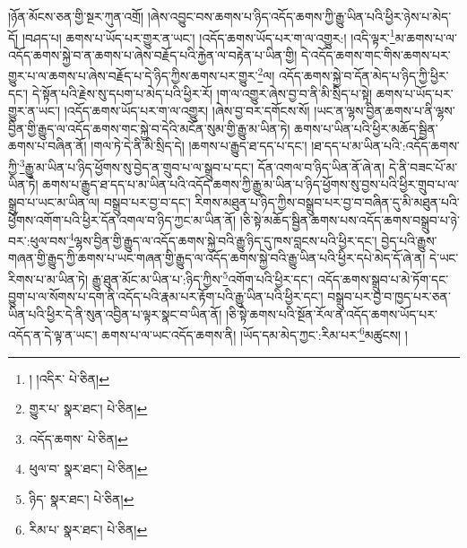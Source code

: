 །ཉོན་མོངས་ཅན་གྱི་སྔར་ཀུན་འགྲོ། །ཞེས་འབྱུང་བས་ཆགས་པ་ཉིད་འདོད་ཆགས་ཀྱི་རྒྱུ་ཡིན་པའི་ཕྱིར་ཉེས་པ་མེད་དོ། །བཤད་པ། ཆགས་པ་ཡོད་པར་གྱུར་ན་ཡང་། །འདོད་ཆགས་ཡོད་པར་ག་ལ་འགྱུར:། །འདི་ལྟར་\footnote{། །འདིར་  པེ་ཅིན། }མ་ཆགས་པ་ལ་འདོད་ཆགས་སྐྱེ་བ་ན་ཆགས་པ་ཞེས་བརྗོད་པའི་རྐྱེན་ལ་བརྟེན་པ་ཡིན་གྱི། དེ་འདོད་ཆགས་གང་གིས་ཆགས་པར་གྱུར་པ་ལ་ཆགས་པ་ཞེས་བརྗོད་པ་དེ་ཉིད་ཀྱིས་ཆགས་པར་གྱུར་\footnote{གྱུར་པ་  སྣར་ཐང་།  པེ་ཅིན། }ལ། འདོད་ཆགས་སྐྱེ་བ་དོན་མེད་པ་ཉིད་ཀྱི་ཕྱིར་དང་། དེ་སྟོན་པའི་རྗེས་སུ་དཔག་པ་མེད་པའི་ཕྱིར་རོ། །ག་ལ་འགྱུར་ཞེས་བྱ་བ་ནི་མི་སྲིད་པ་སྟེ། ཆགས་པ་ཡོད་པར་གྱུར་ན་ཡང་། །འདོད་ཆགས་ཡོད་པར་ག་ལ་འགྱུར། །ཞེས་བྱ་བར་དགོངས་སོ། །ཡང་ན་ལྷས་བྱིན་ཆགས་པ་ནི་ལྷས་བྱིན་གྱི་རྒྱུད་ལ་འདོད་ཆགས་གང་སྐྱེ་བ་དེའི་མངོན་སུམ་གྱི་རྒྱུ་མ་ཡིན་ཏེ། ཆགས་པ་ཡིན་པའི་ཕྱིར་མཆོད་སྦྱིན་ཆགས་པ་བཞིན་ནོ། །གལ་ཏེ་དེ་ནི་མི་སྲིད་དེ། །ཆགས་པ་རྒྱུད་ཐ་དད་པ་དང་། །ཐ་དད་པ་མ་ཡིན་པའི་:འདོད་ཆགས་ཀྱི་\footnote{འདོད་ཆགས་  པེ་ཅིན། }རྒྱུ་མ་ཡིན་པ་ཉིད་ཕྱོགས་སུ་བྱེད་ན་གྲུབ་པ་ལ་སྒྲུབ་པ་དང་། དོན་འགལ་བ་ཉིད་ཡིན་ནོ་ཞེ་ན། དེ་ནི་བཟང་པོ་མ་ཡིན་ཏེ། ཆགས་པ་རྒྱུད་ཐ་དད་པ་མ་ཡིན་པའི་འདོད་ཆགས་ཀྱི་རྒྱུ་མ་ཡིན་པ་ཉིད་ཕྱོགས་སུ་བྱས་པའི་ཕྱིར་གྲུབ་པ་ལ་སྒྲུབ་པ་ཡང་མ་ཡིན་ལ། བསྒྲུབ་པར་བྱ་བ་དང་། རིགས་མཐུན་པ་ཉིད་ཀྱིས་བསྒྲུབ་པར་བྱ་བ་བཞིན་དུ་མི་མཐུན་པའི་ཕྱོགས་འགོག་པའི་ཕྱིར་དོན་འགལ་བ་ཉིད་ཀྱང་མ་ཡིན་ནོ། །ཅི་སྟེ་མཆོད་སྦྱིན་ཆགས་པས་འདོད་ཆགས་བསྒྲུབ་པ་ཉེ་བར་:ཕུལ་བས་\footnote{ཕུལ་བ་  སྣར་ཐང་།  པེ་ཅིན། }ལྷས་བྱིན་གྱི་རྒྱུད་ལ་འདོད་ཆགས་སྐྱེ་བའི་རྒྱུ་ཉིད་དུ་ཁས་བླངས་པའི་ཕྱིར་དང་། བྱེད་པའི་རྒྱུས་གཞན་གྱི་རྒྱུད་ཀྱི་ཆགས་པ་ཡང་གཞན་གྱི་རྒྱུད་ལ་འདོད་ཆགས་སྐྱེ་བའི་རྒྱུ་ཡིན་པའི་ཕྱིར་དཔེ་མེད་དོ་ཞེ་ན། དེ་ཡང་རིགས་པ་མ་ཡིན་ཏེ། རྒྱུ་ཐུན་མོང་མ་ཡིན་པ་:ཉིད་ཀྱིས་\footnote{ཉིད་  སྣར་ཐང་།  པེ་ཅིན། }འགོག་པའི་ཕྱིར་དང་། འདོད་ཆགས་སྒྲུབ་པ་མེ་ཏོག་དང་བྱུག་པ་ལ་སོགས་པ་དག་ནི་འདོད་པའི་རྣམ་པར་རྟོག་པའི་རྒྱུ་ཡིན་པའི་ཕྱིར་དང་། བསྒྲུབ་པར་བྱ་བ་ཁྱད་པར་ཅན་ཡིན་པའི་ཕྱིར་དེ་ནི་སུན་འབྱིན་པ་ལྟར་སྣང་བ་ཡིན་ནོ། །ཅི་སྟེ་ཆགས་པའི་སྔོན་རོལ་ན་འདོད་ཆགས་ཡོད་པར་འདོད་ན་དེ་ལྟ་ན་ཡང་། ཆགས་པ་ལ་ཡང་འདོད་ཆགས་ནི། །ཡོད་དམ་མེད་ཀྱང་:རིམ་པར་\footnote{རིམ་པ་  སྣར་ཐང་།  པེ་ཅིན། }མཚུངས། །
